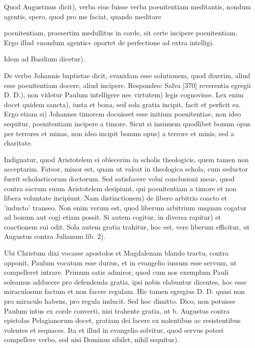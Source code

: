 Quod Augustinus dicit), verba eius fuisse verba poenitentiam meditantis, nondum agentis, spero, quod pro me faciat, quando meditare

poenitentiam, praesertim medullitus in corde, sit certe incipere poenitentiam. Ergo illud »nondum agentis« oportet de perfectione ad extra intelligi.

Idem ad Basilium dicetur).

De verbo Johannis baptistae dicit, evanidam esse solutionem, quod dixerim, aliud esse poenitentiam docere, aliud incipere. Respondeo: Salva [370] reverentia egregii D. D.), non videtur Paulum intelligere nec virtutem) legis cognovisse. Lex enim docet quidem sancta), iusta et bona, sed sola gratia incipit, facit et perficit ea. Ergo etiam si) Johannes timorem docuisset esse initium poenitentiae, non ideo sequitur, poenitentiam incipere a timore. Sicut si insinuem quodlibet bonum opus per terrores et minas, non ideo incipit bonum opus) a terrore et minis, sed a charitate.

Indignatur, quod Aristotelem ei obiecerim in scholis theologicis, quem tamen non acceptarim. Fateor, minor est, quam ut valeat in theologica schola, cum seductor fuerit scholasticorum doctorum. Sed satisfacere volui conclusioni meae, quod contra sacrum suum Aristotelem desipiunt, qui poenitentiam a timore et non libera voluntate incipiunt. Nam distinctionem) de libero arbitrio coacto et 'inducto' transeo. Non enim verum est, quod liberum arbitrium unquam cogatur ad bonum aut cogi etiam possit. Si autem cogitur, in diversa rapitur) et coactionem sui odit. Sola autem gratia trahitur, hoc est, vere liberum efficitur, ut Augustus contra Julianum lib. 2).

Ubi Christum dixi vocasse apostolos et Magdalenam blando tractu, contra opponit, Paulum vocatum esse durius, et in evangelio iussum esse servum, ut compelleret intrare. Primum satis admiror, quod cum nos exemplum Pauli soleamus adducere pro defendenda gratia, ipsi nobis elabuntur dicentes, hoc esse miraculosum factum et non facere regulam. Hic tamen egregius D. D. quasi non pro miraculo habens, pro regula inducit. Sed hoc dimitto. Dico, non potuisse Paulum intus ex corde converti, nisi trahente gratia, ut b. Augustus contra epistolas Pelagianorum docet, gratiam dei facere ex nolentibus ac resistentibus volentes et sequaces. Ita et illud in evangelio solvitur, quod servus potest compellere verbo, sed nisi Dominus sibilet, nihil sequitur).

